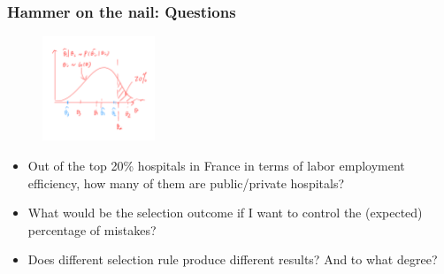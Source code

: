 \documentclass[10pt, aspectratio=169]{beamer}
\begin{document}






\begin{frame}
  \frametitle{Hammer on the nail: Questions}
  \begin{figure}
    \centering
    \includegraphics[width=0.3\textwidth]{../../../Figures/drawing.png}
  \end{figure}

  \begin{itemize}
    \item Out of the top 20\% hospitals in France in terms of labor employment
          efficiency, how many of them are public/private hospitals?
    \item What would be the selection outcome if I want to control the (expected)
          percentage of mistakes?
    \item Does different selection rule produce different results? And to what degree?
  \end{itemize}
\end{frame}
\end{document}

